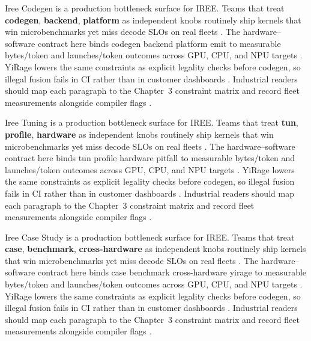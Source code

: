 Iree Codegen is a production bottleneck surface for IREE. Teams that treat \textbf{codegen}, \textbf{backend}, \textbf{platform} as independent knobs routinely ship kernels that win microbenchmarks yet miss decode SLOs on real fleets \citep{dlbook,nvidia2024cudagraphs}. The hardware--software contract here binds codegen backend platform emit to measurable bytes/token and launches/token outcomes across GPU, CPU, and NPU targets \citep{dao2022flashattention,liu2024deepseekv3}. YiRage lowers the same constraints as explicit legality checks before codegen, so illegal fusion fails in CI rather than in customer dashboards \citep{kwon2023vllm,patel2025llminference}. Industrial readers should map each paragraph to the Chapter~3 constraint matrix and record fleet measurements alongside compiler flags \citep{nvidia2024cudagraphs,taxbreak2026}.

Iree Tuning is a production bottleneck surface for IREE. Teams that treat \textbf{tun}, \textbf{profile}, \textbf{hardware} as independent knobs routinely ship kernels that win microbenchmarks yet miss decode SLOs on real fleets \citep{dao2022flashattention,liu2024deepseekv3}. The hardware--software contract here binds tun profile hardware pitfall to measurable bytes/token and launches/token outcomes across GPU, CPU, and NPU targets \citep{kwon2023vllm,patel2025llminference}. YiRage lowers the same constraints as explicit legality checks before codegen, so illegal fusion fails in CI rather than in customer dashboards \citep{nvidia2024cudagraphs,taxbreak2026}. Industrial readers should map each paragraph to the Chapter~3 constraint matrix and record fleet measurements alongside compiler flags \citep{liu2024deepseekv3,memoryfloor2026}.

Iree Case Study is a production bottleneck surface for IREE. Teams that treat \textbf{case}, \textbf{benchmark}, \textbf{cross-hardware} as independent knobs routinely ship kernels that win microbenchmarks yet miss decode SLOs on real fleets \citep{kwon2023vllm,patel2025llminference}. The hardware--software contract here binds case benchmark cross-hardware yirage to measurable bytes/token and launches/token outcomes across GPU, CPU, and NPU targets \citep{nvidia2024cudagraphs,taxbreak2026}. YiRage lowers the same constraints as explicit legality checks before codegen, so illegal fusion fails in CI rather than in customer dashboards \citep{liu2024deepseekv3,memoryfloor2026}. Industrial readers should map each paragraph to the Chapter~3 constraint matrix and record fleet measurements alongside compiler flags \citep{patel2025llminference,nvidia2022hopper}.

